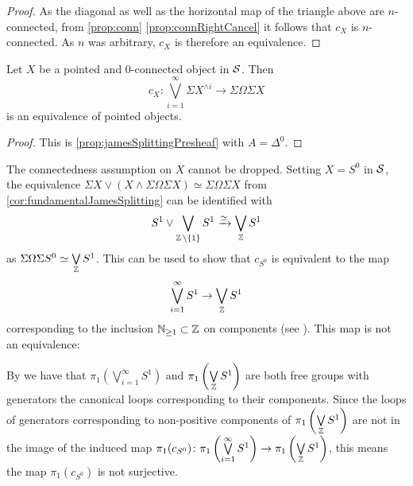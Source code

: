 \begin{prop}
\begin{proof}
        As the diagonal as well as the horizontal map of the triangle above are $n$-connected, from \cref{prop:conn} \ref{prop:connRightCancel} it follows that $c_X$ is $n$-connected. 
        As $n$ was arbitrary, $c_X$ is therefore an equivalence.
    \end{proof}
\end{prop}
\begin{corollary}\label{cor:classicalJamesSplitting}
    Let $X$ be a pointed and $0$-connected object in $\mathcal{S}$.
    Then     
    \begin{equation*}
        c_X\colon\bigvee\limits_{i=1}^{\infty}\Sigma X^{\wedge i}\to\Sigma\Omega\Sigma X
    \end{equation*}
    is an equivalence of pointed objects. 
    \begin{proof}
        This is \cref{prop:jamesSplittingPresheaf} with $A=\Delta^0$.
    \end{proof}
\end{corollary}
\begin{remark}
    The connectedness assumption on $X$ cannot be dropped.
    Setting $X=S^0$ in $\mathcal{S}$, the equivalence $\Sigma X\vee (X\wedge \Sigma\Omega\Sigma X)\simeq\Sigma\Omega\Sigma X$ from \cref{cor:fundamentalJamesSplitting} can be identified with
    \begin{equation*}
        S^1\vee \bigvee\limits_{\operatorname{\mathbb{Z}}\setminus\left\lbrace1\right\rbrace}S^1\xrightarrow{\simeq}\bigvee\limits_{\operatorname{\mathbb{Z}}}S^1
    \end{equation*}
    as $\Sigma\Omega\Sigma S^0\simeq\bigvee\limits_{\operatorname{\mathbb{Z}}}S^1$.
    This can be used to show that $c_{S^0}$ is equivalent to the map
    \begin{equation*}
        \bigvee\limits_{i=1}^{\infty} S^1\to\bigvee\limits_{\operatorname{\mathbb{Z}}} S^1
    \end{equation*}
    corresponding to the inclusion $\mathbb{N}_{\geq1}\subset\operatorname{\mathbb{Z}}$ on components (see \cite[Warning 2.13]{splittings_21}).
    This map is not an equivalence:

    By \cite[Proposition 1A.2]{hatcher2002algebraic} we have that $\pi_1\left(\bigvee\limits_{i=1}^{\infty} S^1\right)$ and $\pi_1\left(\bigvee\limits_{\operatorname{\mathbb{Z}}} S^1\right)$ are both free groups with generators the canonical loops corresponding to their components.
    Since the loops of generators corresponding to non-positive components of $\pi_1\left(\bigvee\limits_{\operatorname{\mathbb{Z}}} S^1\right)$ are not in the image of the induced map $\pi_1(c_{S^0})\colon\pi_1\left(\bigvee\limits_{i=1}^{\infty} S^1\right)\to\pi_1\left(\bigvee\limits_{\operatorname{\mathbb{Z}}} S^1\right)$, this means the map $\pi_1(c_{S^0})$ is not surjective.
\end{remark}
